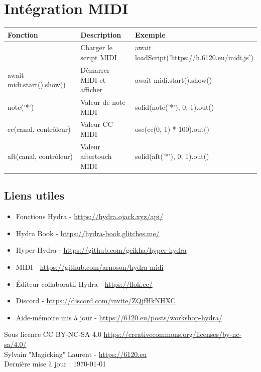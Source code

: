 \documentclass[9pt,oneside]{amsart}
\begin{document}
\section*{Intégration MIDI}
\begin{tabular}{L{0.36\linewidth}L{0.28\linewidth}L{0.40\linewidth}}
\toprule
\textbf{Fonction} & \textbf{Description} & \textbf{Exemple} \\
\midrule
 & Charger le script MIDI & await loadScript('https://h.6120.eu/midi.js') \\
await midi.start().show() & Démarrer MIDI et afficher & await midi.start().show() \\
note('*') & Valeur de note MIDI & solid(note('*'), 0, 1).out() \\
cc(canal, contrôleur) & Valeur CC MIDI & osc(cc(0, 1) * 100).out() \\
aft(canal, contrôleur) & Valeur aftertouch MIDI & solid(aft('*'), 0, 1).out() \\
\bottomrule
\end{tabular}

\subsection*{Liens utiles}
\begin{itemize}
\item Fonctions Hydra - \url{https://hydra.ojack.xyz/api/}
\item Hydra Book - \url{https://hydra-book.glitches.me/}
\item Hyper Hydra - \url{https://github.com/geikha/hyper-hydra}
\item MIDI - \url{https://github.com/arnoson/hydra-midi}
\item Éditeur collaboratif Hydra - \url{https://flok.cc/}
\item Discord - \url{https://discord.com/invite/ZQjfHkNHXC}
\item Aide-mémoire mis à jour - \url{https://6120.eu/posts/workshop-hydra/}
\end{itemize}
\vspace{2cm}
Sous licence CC BY-NC-SA 4.0 \url{https://creativecommons.org/licenses/by-nc-sa/4.0/} \\
Sylvain "Magicking" Laurent - \url{https://6120.eu} \\
Dernière mise à jour : \today\\
\end{document}
